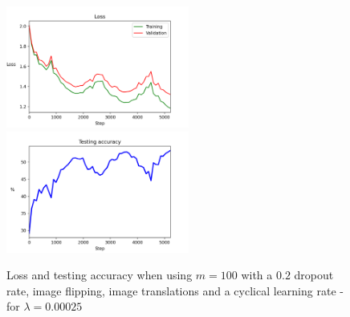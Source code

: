 \documentclass{article}
\begin{document}
	\begin{figure}[!h]
	\centering
	\includegraphics[width=6cm]{../plots/cyclical/loss_v2.png}
	\includegraphics[width=6cm]{../plots/cyclical/acc_v2.png}
	\caption{Loss and testing accuracy when using $m=100$ with a $0.2$ dropout rate, image flipping, image translations and a cyclical learning rate - for $\lambda=0.00025$}
	\end{figure}


\newpage
\end{document}
